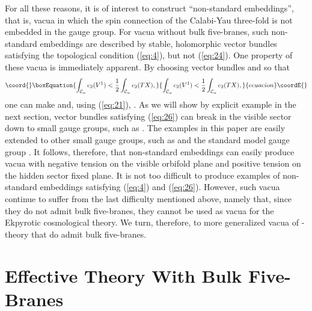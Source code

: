 \documentclass[a4paper,12pt]{article}
\numberwithin{equation}{section}
\theoremstyle{plain}
\begin{document}
For all these reasons, it is of interest to construct ``non-standard
embeddings'', that is, vacua in which the spin connection of the Calabi-Yau 
three-fold is not embedded in the gauge group. For vacua without bulk
five-branes, such non-standard embeddings are described by stable, holomorphic
vector bundles satisfying the topological condition (\ref{eq:4}), but not
(\ref{eq:24}). One property of these vacua is immediately apparent. By
choosing vector bundles \coordHE{} and \coordHE{} so that
%
\begin{equation}\coord{}\boxEquation{
\int_{{\cal{C}}_{\omega}}{c_{2}(V^{1})} < \frac{1}{2}\int_{{\cal{C}}_{\omega}}
{c_{2}(TX)},
\label{eq:26}
}{
\int_{{\cal{C}}_{\omega}}{c_{2}(V^{1})} < \frac{1}{2}\int_{{\cal{C}}_{\omega}}
{c_{2}(TX)},
}{ecuacion}\coordE{}\end{equation}
%
one can make \coordHE{} and, using (\ref{eq:21}), \coordHE{}. As we
will show by explicit example in the next section, vector bundles
\coordHE{} satisfying (\ref{eq:26}) can break \coordHE{} in the visible sector 
down to small gauge groups, such as \coordHE{}. The examples in this paper are
easily extended to other small gauge groups, such as \coordHE{} and the standard model 
gauge group \coordHE{}. It follows,
therefore, that non-standard embeddings can easily produce vacua with negative
tension on the visible orbifold plane and positive tension on the hidden
sector fixed plane. It is not too difficult to produce examples of
non-standard embeddings satisfying (\ref{eq:4}) and (\ref{eq:26}). However,
such vacua continue to suffer from the last difficulty mentioned above, namely
that, since they do not  admit bulk five-branes, they cannot be
used as vacua for the Ekpyrotic cosmological theory. We turn, therefore, to
more generalized vacua of \coordHE{}-theory that do admit bulk five-branes.



\section{Effective Theory With Bulk Five-Branes}
\end{document}
